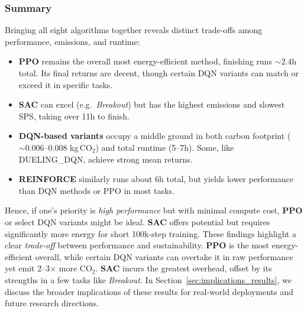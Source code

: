 \subsubsection{Summary}
Bringing all eight algorithms together reveals distinct trade‐offs among performance, 
emissions, and runtime:
\begin{itemize}
	\item \textbf{PPO} remains the overall most energy-efficient method, 
	finishing runs $\sim2.4$h total. Its final returns are decent, though 
	certain DQN variants can match or exceed it in specific tasks.
	\item \textbf{SAC} can excel (e.g.\ \emph{Breakout}) but has the highest 
	emissions and slowest SPS, taking over 11h to finish.
	\item \textbf{DQN-based variants} occupy a middle ground in both carbon 
	footprint ($\sim0.006$--0.008 kg\,CO$_2$) and total runtime (5--7h). 
	Some, like DUELING\_DQN, achieve strong mean returns.
	\item \textbf{REINFORCE} similarly runs about 6h total, but yields lower 
	performance than DQN methods or PPO in most tasks.
\end{itemize}
Hence, if one’s priority is \emph{high performance} but with minimal compute cost, 
\textbf{PPO} or select DQN variants might be ideal. \textbf{SAC} offers potential 
but requires significantly more energy for short 100k-step training. These findings 
highlight a clear \emph{trade‐off} between performance and sustainability. 
\textbf{PPO} is the most energy-efficient overall, while certain DQN variants can 
overtake it in raw performance yet emit 2--3$\times$ more CO$_2$. \textbf{SAC} 
incurs the greatest overhead, offset by its strengths in a few tasks like 
\emph{Breakout}. In Section~\ref{sec:implications_results}, we discuss the broader 
implications of these results for real-world deployments and future research directions.

